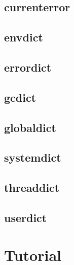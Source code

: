 \subsection{currenterror}
\subsection{envdict}
\subsection{errordict}
\subsection{gcdict}
\subsection{globaldict}
\subsection{systemdict}
\subsection{threaddict}
\subsection{userdict}

\section{Tutorial}

